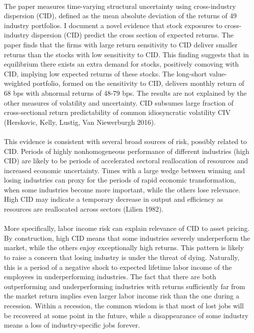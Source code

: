 \documentclass[12pt]{article}
\begin{document}
\paragraph{}
The paper measures time-varying structural uncertainty using cross-industry dispersion (CID), defined as the mean absolute deviation of the returns of 49 industry portfolios. I document a novel evidence that stock exposures to cross-industry dispersion (CID) predict the cross section of expected returns. The paper finds that the firms with large return sensitivity to CID deliver smaller returns than the stocks with low sensitivity to CID. This finding suggests that in equilibrium there exists an extra demand for stocks, positively comoving with CID, implying low expected returns of these stocks. The long-short value-weighted portfolio, formed on the sensitivity to CID, delivers monthly return of 68 bps with abnormal returns of 48-79 bps. The results are not explained by the other measures of volatility and uncertainty. CID subsumes large fraction of cross-sectional return predictability of common idiosyncratic volatility CIV (Herskovic, Kelly, Lustig, Van Niewerburgh 2016). 
\paragraph{}
This evidence is consistent with several broad sources of risk, possibly related to CID. Periods of highly nonhomogeneous performance of different industries (high CID) are likely to be periods of accelerated sectoral reallocation of resources and increased economic uncertainty. Times with a large wedge between winning and losing industries can proxy for the periods of rapid economic transformation, when some industries become more important, while the others lose relevance. High CID may indicate a temporary decrease in output and efficiency as resources are reallocated across sectors (Lilien 1982). 
\paragraph{}
More specifically, labor income risk can explain relevance of CID to asset pricing. By construction, high CID means that some industries severely underperform the market, while the others enjoy exceptionally high returns. This pattern is likely to raise a concern that losing industry is under the threat of dying. Naturally, this is a period of a negative shock to expected lifetime labor income of the employees in underperforming industries. The fact that there are both outperforming and underperforming industries with returns sufficiently far from the market return implies even larger labor income risk than the one during a recession. Within a recession, the common wisdom is that most of lost jobs will be recovered at some point in the future, while a disappearance of some industry means a loss of industry-specific jobs forever. 
\end{document}
